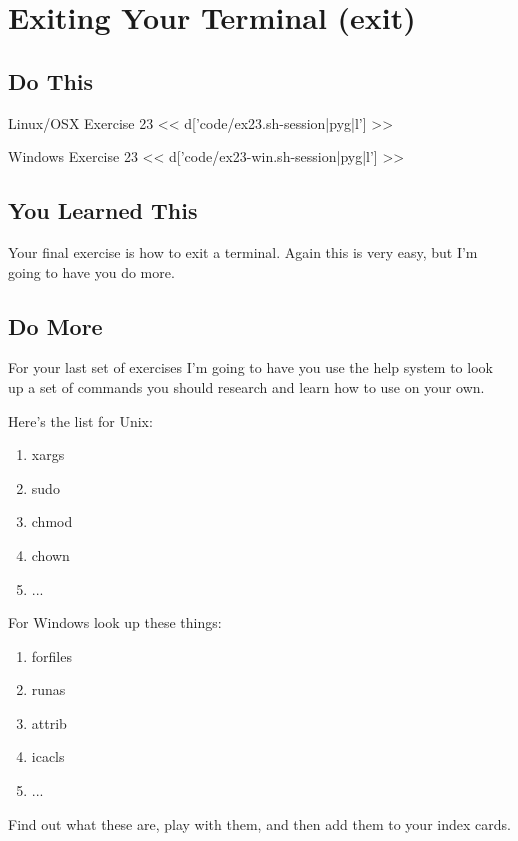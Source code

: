 \chapter{Exiting Your Terminal (exit)}

\section{Do This}

\begin{code}{Linux/OSX Exercise 23}
<< d['code/ex23.sh-session|pyg|l'] >>
\end{code}

\begin{code}{Windows Exercise 23}
<< d['code/ex23-win.sh-session|pyg|l'] >>
\end{code}

\section{You Learned This}

Your final exercise is how to exit a terminal.  Again this is very easy, but
I'm going to have you do more.

\section{Do More}

For your last set of exercises I'm going to have you use the help system to look up
a set of commands you should research and learn how to use on your own.

Here's the list for Unix:

\begin{enumerate}
\item xargs
\item sudo
\item chmod
\item chown
\item ...
\end{enumerate}


For Windows look up these things:

\begin{enumerate}
\item forfiles
\item runas
\item attrib
\item icacls
\item ...
\end{enumerate}

Find out what these are, play with them, and then add them to your index cards.
